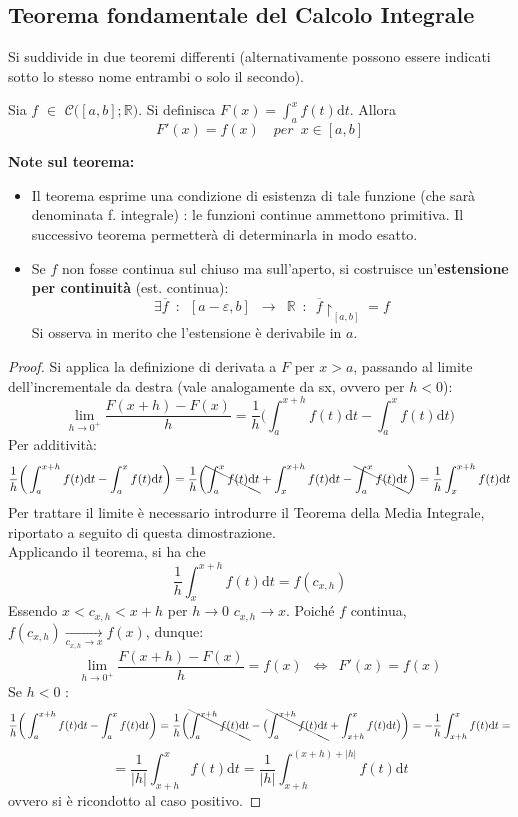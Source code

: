 \documentclass[10pt]{article}
\theoremstyle{plain}
\begin{document}
\subsection{Teorema fondamentale del Calcolo Integrale}
Si suddivide in due teoremi differenti (alternativamente possono essere indicati sotto lo stesso nome entrambi o solo il secondo).

\begin{ther}[Teorema 1]
    Sia $f$ $\in$ $\mathcal{C}\big([a,b] ; \mathbb{R}\big)$. Si definisca $F(x) = \int_a^x f(t) \textrm{d}t$. Allora
    \[F'(x) = f(x) \quad per \enspace x \in [a,b]\]
\end{ther}
\textbf{Note sul teorema:}
\begin{itemize}[label=$\blacksquare$]
    \item Il teorema esprime una condizione di esistenza di tale funzione (che sarà denominata f. integrale) : le funzioni continue ammettono primitiva. Il successivo teorema permetterà di determinarla in modo esatto.
    \item Se $f$ non fosse continua sul chiuso ma sull'aperto, si costruisce un'\textbf{estensione per continuità} (est. continua):
    \[\exists \overline{f} \enspace : \enspace [a-\varepsilon,b] \enspace \rightarrow \enspace \mathbb{R} \enspace : \enspace \overline{f}\restriction_{[a,b]} = f\]
    Si osserva in merito che l'estensione è derivabile in $a$.
\end{itemize}

\begin{proof}
    Si applica la definizione di derivata a $F$ per $x>a$, passando al limite dell'incrementale da destra (vale analogamente da sx, ovvero per $h < 0$):
    \[\lim\limits_{h \rightarrow 0^+} \frac{F(x+h) - F(x)}{h} = \frac{1}{h}\bigg(\int_a^{x+h}f(t)\textrm{d}t - \int_a^{x}f(t)\textrm{d}t\bigg)\]
    Per additività:
    \[\frac{1}{h}\bigg(\int_a^{x+h}f(t)\textrm{d}t - \int_a^{x}f(t)\textrm{d}t\bigg) = \frac{1}{h}\bigg(\bcancel{\int_a^{x}f(t)\textrm{d}t} + \int_x^{x+h}f(t)\textrm{d}t- \bcancel{\int_a^{x}f(t)\textrm{d}t}\bigg) = \frac{1}{h}\int_x^{x+h}f(t)\textrm{d}t\]
    Per trattare il limite è necessario introdurre il Teorema della Media Integrale, riportato a seguito di questa dimostrazione.
    \\Applicando il teorema, si ha che 
    \[ \frac{1}{h}\int_x^{x+h}f(t)\textrm{d}t = f(c_{x,h})\]
    Essendo $x < c_{x,h} < x+h$ per $h \rightarrow 0$ $c_{x,h} \rightarrow x$. Poiché $f$ continua, $f(c_{x,h}) \xrightarrow[c_{x,h} \rightarrow x]{} f(x)$, dunque:
    \[\lim\limits_{h \rightarrow 0^+} \frac{F(x+h) - F(x)}{h} = f(x) \enspace \Longleftrightarrow \enspace F'(x) = f(x)\]
    Se $h < 0$ :
    \[\frac{1}{h}\bigg(\int_a^{x+h}f(t)\textrm{d}t - \int_a^{x}f(t)\textrm{d}t\bigg) = \frac{1}{h}\bigg(\bcancel{\int_a^{x+h}f(t)\textrm{d}t} - \big(\bcancel{\int_a^{x+h}f(t)\textrm{d}t} + \int_{x+h}^{x}f(t)\textrm{d}t\big)\bigg) = - \frac{1}{h}\int_{x+h}^{x}f(t)\textrm{d}t =\]
    \[= \frac{1}{|h|}\int_{x+h}^{x}f(t)\textrm{d}t = \frac{1}{|h|}\int_{x+h}^{(x+h) + |h|}f(t)\textrm{d}t\]
    ovvero si è ricondotto al caso positivo.
\end{proof}
\end{document}
